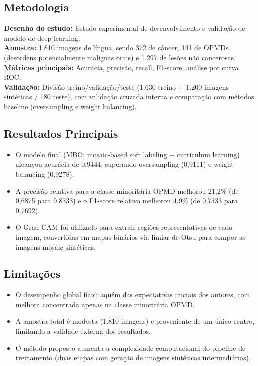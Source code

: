 \subsection{Metodologia}
\textbf{Desenho do estudo:} Estudo experimental de desenvolvimento e validação de
modelo de deep learning. \\
\textbf{Amostra:} 1.810 imagens de língua, sendo 372 de câncer, 141 de OPMDs
(desordens potencialmente malignas orais) e 1.297 de lesões não cancerosas. \\
\textbf{Métricas principais:} Acurácia, precisão, recall, F1-score, análise por
curva ROC. \\
\textbf{Validação:} Divisão treino/validação/teste (1.630 treino + 1.200 imagens
sintéticas / 180 teste), com validação cruzada interna e comparação com métodos
baseline (oversampling e weight balancing).

\subsection{Resultados Principais}
\begin{itemize}
  \item O modelo final (MBO: mosaic-based soft labeling + curriculum learning)
        alcançou acurácia de 0,9444, superando oversampling (0,9111) e weight
        balancing (0,9278).
  \item A precisão relativa para a classe minoritária OPMD melhorou 21,2\% (de
        0,6875 para 0,8333) e o F1-score relativo melhorou 4,9\% (de 0,7333 para
        0,7692).
  \item O Grad-CAM foi utilizado para extrair regiões representativas de cada
        imagem, convertidas em mapas binários via limiar de Otsu para compor as
        imagens mosaic sintéticas.
\end{itemize}

\subsection{Limitações}
\begin{itemize}
  \item O desempenho global ficou aquém das expectativas iniciais dos autores,
        com melhora concentrada apenas na classe minoritária OPMD.
  \item A amostra total é modesta (1.810 imagens) e proveniente de um único
        centro, limitando a validade externa dos resultados.
  \item O método proposto aumenta a complexidade computacional do pipeline de
        treinamento (duas etapas com geração de imagens sintéticas intermediárias).
\end{itemize}

